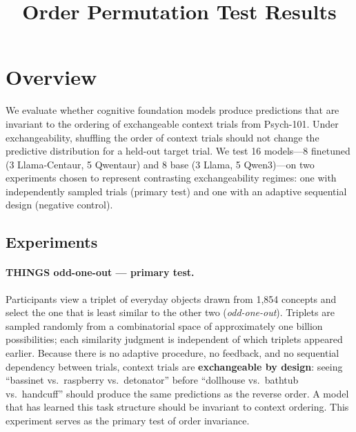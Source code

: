 \documentclass[11pt]{article}
\title{Order Permutation Test Results}
\author{}
\date{}
\begin{document}
\maketitle

\section{Overview}

We evaluate whether cognitive foundation models produce predictions that are invariant to the ordering of exchangeable context trials from Psych-101.
Under exchangeability, shuffling the order of context trials should not change the predictive distribution for a held-out target trial.
We test 16 models---8 finetuned (3 Llama-Centaur, 5 Qwentaur) and 8 base (3 Llama, 5 Qwen3)---on two experiments chosen to represent contrasting exchangeability regimes: one with independently sampled trials (primary test) and one with an adaptive sequential design (negative control).

\subsection{Experiments}

\paragraph{THINGS odd-one-out \citep{hebart2023things} --- primary test.}
Participants view a triplet of everyday objects drawn from 1{,}854 concepts and select the one that is least similar to the other two (\emph{odd-one-out}).
Triplets are sampled randomly from a combinatorial space of approximately one billion possibilities; each similarity judgment is independent of which triplets appeared earlier.
Because there is no adaptive procedure, no feedback, and no sequential dependency between trials, context trials are \textbf{exchangeable by design}: seeing ``bassinet vs.\ raspberry vs.\ detonator'' before ``dollhouse vs.\ bathtub vs.\ handcuff'' should produce the same predictions as the reverse order.
A model that has learned this task structure should be invariant to context ordering.
This experiment serves as the primary test of order invariance.
\end{document}
